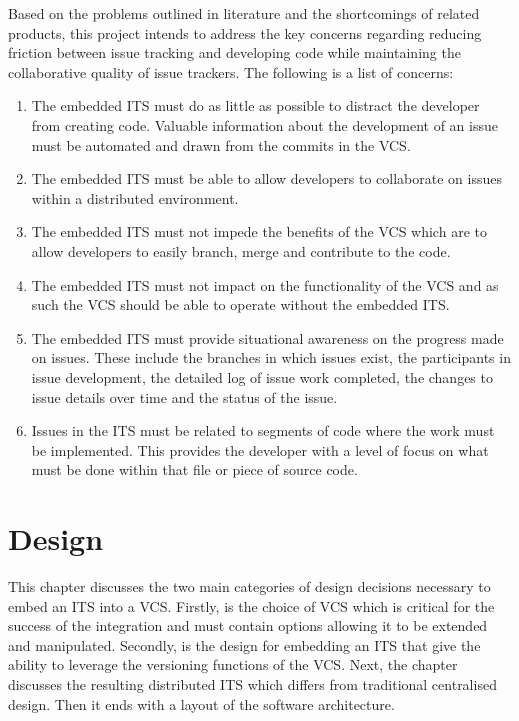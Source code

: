 \documentclass{mproj}
\begin{document}
Based on the problems outlined in literature and the shortcomings of related products, this project intends to address the key concerns regarding reducing friction between issue tracking and developing code while maintaining the collaborative quality of issue trackers. The following is a list of concerns:

\begin{enumerate}
  \item The embedded ITS must do as little as possible to distract the developer from creating code. Valuable information about the development of an issue must be automated and drawn from the commits in the VCS.
  \item The embedded ITS must be able to allow developers to collaborate on issues within a distributed environment.
  \item The embedded ITS must not impede the benefits of the VCS which are to allow developers to easily branch, merge and contribute to the code.
  \item The embedded ITS must not impact on the functionality of the VCS and as such the VCS should be able to operate without the embedded ITS.
  \item The embedded ITS must provide situational awareness on the progress made on issues. These include the branches in which issues exist, the participants in issue development, the detailed log of issue work completed, the changes to issue details over time and the status of the issue.
  \item Issues in the ITS must be related to segments of code where the work must be implemented. This provides the developer with a level of focus on what must be done within that file or piece of source code.
\end{enumerate}



\chapter{Design}\label{design}

This chapter discusses the two main categories of design decisions necessary to embed an ITS into a VCS. Firstly, is the choice of VCS which is critical for the success of the integration and must contain options allowing it to be extended and manipulated. Secondly, is the design for embedding an ITS that give the ability to leverage the versioning functions of the VCS. Next, the chapter discusses the resulting distributed ITS which differs from traditional centralised design. Then it ends with a layout of the software architecture.
\end{document}
